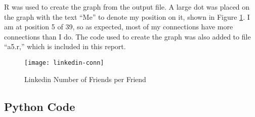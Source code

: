 \documentclass[paper=a4, fontsize=11pt]{scrartcl} %
\numberwithin{equation}{section} %
\numberwithin{figure}{section} %
\numberwithin{table}{section} %
\begin{document}
R was used to create the graph from the output file.
A large dot was placed on the graph with the text ``Me'' to denote my position on it, shown in Figure \ref{fig:linkedin}.\cite{bib:rline}
I am at position 5 of 39, so as expected, most of my connections have more connections than I do.  
The code used to create the graph was also added to file ``a5.r,'' which is included in this report.

\begin{figure}[H]
\texttt{[image: linkedin-conn]}
\caption{Linkedin Number of Friends per Friend}
\label{fig:linkedin}
\end{figure}

\subsection{Python Code}





\newpage

{}

\end{document}

